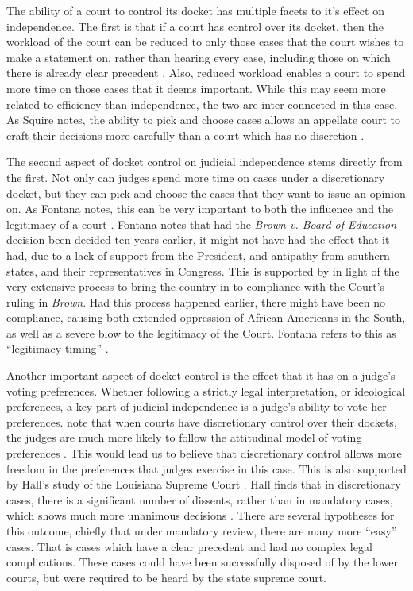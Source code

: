 \documentclass[12pt]{article}
\begin{document}
The ability of a court to control its docket has multiple facets to it's effect on independence.  The first is that if a court has control over its docket, then the workload of the court can be reduced to only those cases that the court wishes to make a statement on, rather than hearing every case, including those on which there is already clear precedent \citep{Maltzman2000}.  Also, reduced workload enables a court to spend more time on those cases that it deems important.  While this may seem more related to efficiency than independence, the two are inter-connected in this case.  As Squire notes, the ability to pick and choose cases allows an appellate court to craft their decisions more carefully than a court which has no discretion \citep{Squire2008}.

The second aspect of docket control on judicial independence stems directly from the first.  Not only can judges spend more time on cases under a discretionary docket, but they can pick and choose the cases that they want to issue an opinion on.  As Fontana notes, this can be very important to both the influence and the legitimacy of a court \citep{Fontana2011}.  Fontana notes that had the \textit{Brown v. Board of Education} decision been decided ten years earlier, it might not have had the effect that it had, due to a lack of support from the President, and antipathy from southern states, and their representatives in Congress.  This is supported by \citet{Rosenberg1991} in light of the very extensive process to bring the country in to compliance with the Court's ruling in \textit{Brown}.  Had this process happened earlier, there might have been no compliance, causing both extended oppression of African-Americans in the South, as well as a severe blow to the legitimacy of the Court.  Fontana refers to this as ``legitimacy timing'' \citep[627]{Fontana2011}.  

Another important aspect of docket control is the effect that it has on a judge's voting preferences.  Whether following a strictly legal interpretation, or ideological preferences, a key part of judicial independence is a judge's ability to vote her preferences.  \citeauthor{Songer2003} note that when courts have discretionary control over their dockets, the judges are much more likely to follow the attitudinal model of voting preferences \citep{Songer2003}.  This would lead us to believe that discretionary control allows more freedom in the preferences that judges exercise in this case.   This is also supported by Hall's study of the Louisiana Supreme Court \citep{Hall1987a,Hall1987b}.  Hall finds that in discretionary cases, there is a significant number of dissents, rather than in mandatory cases, which shows much more unanimous decisions \citep{Hall1985}.  There are several hypotheses for this outcome, chiefly that under mandatory review, there are many more ``easy'' cases.  That is cases which have a clear precedent and had no complex legal complications.  These cases could have been successfully disposed of by the lower courts, but were required to be heard by the state supreme court.   
\end{document}
